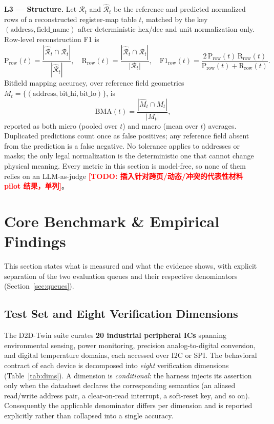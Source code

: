 \documentclass[preprint,review]{elsarticle}
\theoremstyle{definition}
\newcommand{\todo}[1]{\textcolor{red}{\textbf{[TODO: #1]}}}
\begin{document}
\textbf{L3 --- Structure.} Let $\mathcal{R}_t$ and $\hat{\mathcal{R}}_t$ be the reference
and predicted normalized rows of a reconstructed register-map table $t$, matched by the key
$(\mathrm{address},\mathrm{field\_name})$ after deterministic hex/dec and unit
normalization only. Row-level reconstruction F1 is
\begin{equation}
\mathrm{P}_{\mathrm{row}}(t)=\frac{|\hat{\mathcal{R}}_t\cap\mathcal{R}_t|}{|\hat{\mathcal{R}}_t|},\quad
\mathrm{R}_{\mathrm{row}}(t)=\frac{|\hat{\mathcal{R}}_t\cap\mathcal{R}_t|}{|\mathcal{R}_t|},\quad
\mathrm{F1}_{\mathrm{row}}(t)=\frac{2\,\mathrm{P}_{\mathrm{row}}(t)\,\mathrm{R}_{\mathrm{row}}(t)}
{\mathrm{P}_{\mathrm{row}}(t)+\mathrm{R}_{\mathrm{row}}(t)}.
\label{eq:l3-row}
\end{equation}
Bitfield mapping accuracy, over reference field geometries $M_t=\{(\mathrm{address},
\mathrm{bit\_hi},\mathrm{bit\_lo})\}$, is
\begin{equation}
\mathrm{BMA}(t)=\frac{|\hat{M}_t\cap M_t|}{|M_t|},
\label{eq:l3-bma}
\end{equation}
reported as both micro (pooled over $t$) and macro (mean over $t$) averages. Duplicated
predictions count once as false positives; any reference field absent from the prediction is
a false negative. No tolerance applies to addresses or masks; the only legal normalization
is the deterministic one that cannot change physical meaning. Every metric in this section
is model-free, so none of them relies on an LLM-as-judge
\todo{插入针对跨页/动态/冲突的代表性材料 pilot 结果，单列}。

\section{Core Benchmark \& Empirical Findings}
\label{sec:core-benchmark}

This section states what is measured and what the evidence shows, with explicit separation of
the two evaluation queues and their respective denominators (Section~\ref{sec:queues}).

\subsection{Test Set and Eight Verification Dimensions}
\label{sec:testset}

The D2D-Twin suite curates \textbf{20 industrial peripheral ICs} spanning environmental
sensing, power monitoring, precision analog-to-digital conversion, and digital temperature
domains, each accessed over I2C or SPI. The behavioral contract of each device is decomposed
into \emph{eight} verification dimensions (Table~\ref{tab:dims}). A dimension is
\emph{conditional}: the harness injects its assertion only when the datasheet declares the
corresponding semantics (an aliased read/write address pair, a clear-on-read interrupt, a
soft-reset key, and so on). Consequently the applicable denominator differs per dimension and
is reported explicitly rather than collapsed into a single accuracy.
\end{document}
